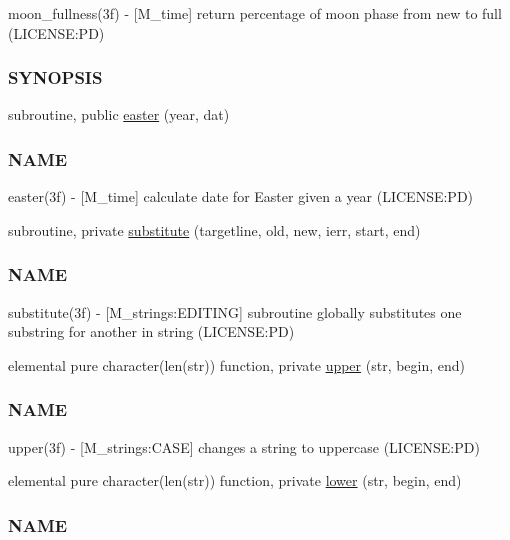 \begin{DoxyCompactItemize}
\begin{DoxyCompactList}
moon\+\_\+fullness(3f) -\/ \mbox{[}M\+\_\+time\mbox{]} return percentage of moon phase from new to full (L\+I\+C\+E\+N\+SE\+:PD) \subsubsection*{S\+Y\+N\+O\+P\+S\+IS}\end{DoxyCompactList}\item 
subroutine, public \mbox{\hyperlink{namespacem__time_a5ccb70e20160fcf26bb403dbff1f138a}{easter}} (year, dat)
\begin{DoxyCompactList}\small\item\em \subsubsection*{N\+A\+ME}

easter(3f) -\/ \mbox{[}M\+\_\+time\mbox{]} calculate date for Easter given a year (L\+I\+C\+E\+N\+SE\+:PD) \end{DoxyCompactList}\item 
subroutine, private \mbox{\hyperlink{namespacem__time_a3c8fc82ff0a77573d0f907d4d44dd9bd}{substitute}} (targetline, old, new, ierr, start, end)
\begin{DoxyCompactList}\small\item\em \subsubsection*{N\+A\+ME}

substitute(3f) -\/ \mbox{[}M\+\_\+strings\+:E\+D\+I\+T\+I\+NG\mbox{]} subroutine globally substitutes one substring for another in string (L\+I\+C\+E\+N\+SE\+:PD) \end{DoxyCompactList}\item 
elemental pure character(len(str)) function, private \mbox{\hyperlink{namespacem__time_af7c0157f921a2716ede225374095c6f2}{upper}} (str, begin, end)
\begin{DoxyCompactList}\small\item\em \subsubsection*{N\+A\+ME}

upper(3f) -\/ \mbox{[}M\+\_\+strings\+:C\+A\+SE\mbox{]} changes a string to uppercase (L\+I\+C\+E\+N\+SE\+:PD) \end{DoxyCompactList}\item 
elemental pure character(len(str)) function, private \mbox{\hyperlink{namespacem__time_a96597ff2f2eab2ede14e3a63bd49254a}{lower}} (str, begin, end)
\begin{DoxyCompactList}\small\item\em \subsubsection*{N\+A\+ME}


\end{DoxyCompactList}
\end{DoxyCompactItemize}
